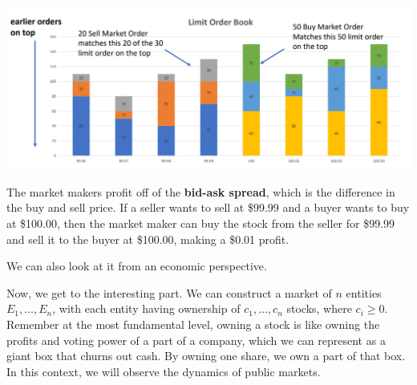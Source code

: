 \documentclass{article}
\begin{document}
    \begin{center}
      \includegraphics[scale=0.3]{img/limit_order_book.png}
    \end{center}

    The market makers profit off of the \textbf{bid-ask spread}, which is the difference in the buy and sell price. If a seller wants to sell at \$99.99 and a buyer wants to buy at \$100.00, then the market maker can buy the stock from the seller for \$99.99 and sell it to the buyer at \$100.00, making a \$0.01 profit. 

    We can also look at it from an economic perspective. 

    Now, we get to the interesting part. We can construct a market of $n$ entities $E_1, \ldots, E_n$, with each entity having ownership of $c_1, \ldots, c_n$ stocks, where $c_i \geq 0$. Remember at the most fundamental level, owning a stock is like owning the profits and voting power of a part of a company, which we can represent as a giant box that churns out cash. By owning one share, we own a part of that box. In this context, we will observe the dynamics of public markets. 
\end{document}
